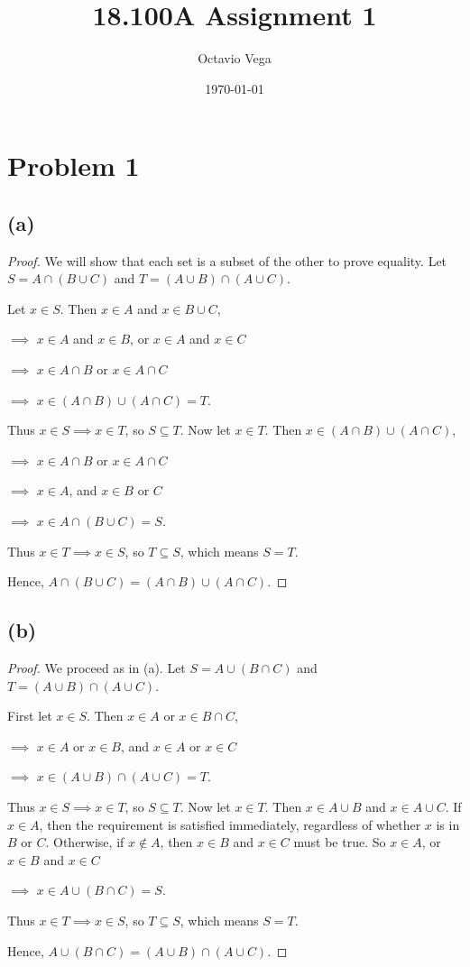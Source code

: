 \documentclass{article}
\title{18.100A Assignment 1}
\author{Octavio Vega}
\date\today
\begin{document}
\maketitle
	
\section*{Problem 1}
\subsection*{(a)}
\begin{proof}
	We will show that each set is a subset of the other to prove equality. Let $S=A\cap (B\cup C)$ and $T=(A\cup B)\cap (A\cup C)$. 
	
	Let $x \in S$. Then $x\in A$ and $x\in B\cup C$, 
	
	$\implies$ $x\in A$ and $x\in B$, or $x\in A$ and $x\in C$
	
	$\implies$ $x\in A\cap B$ or $x\in A\cap C$
	
	$\implies$ $x\in (A\cap B) \cup (A\cap C) = T$.
	
	Thus $x\in S \implies x\in T$, so $S\subseteq T$. Now let $x\in T$. Then $x\in (A\cap B) \cup (A\cap C)$,
	
	$\implies$ $x\in A\cap B$ or $x\in A \cap C$
	
	$\implies$ $x\in A$, and $x\in B$ or $C$
	
	$\implies$ $x\in A \cap (B\cup C) = S$. 
	
	Thus $x\in T \implies x\in S$, so $T\subseteq S$, which means $S=T$.
	
	Hence, $A\cap (B\cup C) = (A\cap B) \cup (A\cap C)$.
	
\end{proof}

\subsection*{(b)}
\begin{proof}
	We proceed as in (a). Let $S = A \cup (B\cap C)$ and $T = (A\cup B) \cap (A\cup C)$. 
	
	First let $x\in S$. Then $x\in A$ or $x\in B\cap C$,
	
	$\implies$ $x\in A$ or $x\in B$, and $x\in A$ or $x\in C$
	
	$\implies$ $x\in (A\cup B)\cap(A\cup C) = T$.
	
	Thus $x\in S \implies x\in T$, so $S\subseteq T$. Now let $x\in T$. Then $x\in A\cup B$ and $x\in A\cup C$. If $x\in A$, then the requirement is satisfied immediately, regardless of whether $x$ is in $B$ or $C$. Otherwise, if $x\notin A$, then $x\in B$ and $x\in C$ must be true. So $x\in A$, or $x\in B$ and $x\in C$
	
	$\implies$ $x\in A\cup(B\cap C) = S$. 
	
	Thus $x\in T \implies x\in S$, so $T \subseteq S$, which means $S = T$. 
	
	Hence, $A\cup(B\cap C) = (A\cup B) \cap (A\cup C)$.
\end{proof}
\end{document}
